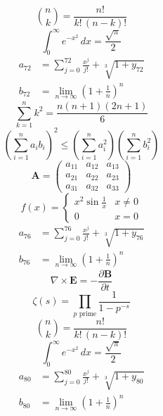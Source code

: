 \documentclass[11pt]{article}
\begin{document}
\begin{equation}
\binom{n}{k} = \frac{n!}{k!\,(n-k)!}
\end{equation}
\begin{equation}
\int_0^\infty e^{-x^2}\,dx = \frac{\sqrt{\pi}}{2}
\end{equation}
\begin{align}
  a_{72} &= \sum_{j=0}^{72} \frac{x^j}{j!} + \sqrt[3]{1+y_{72}} \\
  b_{72} &= \lim_{n\to\infty} \left(1+\frac{1}{n}\right)^{n}
\end{align}
\begin{equation}
\sum_{k=1}^{n} k^2 = \frac{n(n+1)(2n+1)}{6}
\end{equation}
\begin{equation}
\left( \sum_{i=1}^n a_i b_i \right)^2 \le \left(\sum_{i=1}^n a_i^2\right)\left(\sum_{i=1}^n b_i^2\right)
\end{equation}
\begin{equation}
\mathbf{A} = \begin{pmatrix} a_{11} & a_{12} & a_{13} \\ a_{21} & a_{22} & a_{23} \\ a_{31} & a_{32} & a_{33} \end{pmatrix}
\end{equation}
\begin{equation}
f(x) = \begin{cases} x^2 \sin\frac{1}{x} & x \ne 0 \\ 0 & x = 0 \end{cases}
\end{equation}
\begin{align}
  a_{76} &= \sum_{j=0}^{76} \frac{x^j}{j!} + \sqrt[3]{1+y_{76}} \\
  b_{76} &= \lim_{n\to\infty} \left(1+\frac{1}{n}\right)^{n}
\end{align}
\begin{equation}
\nabla \times \mathbf{E} = -\frac{\partial \mathbf{B}}{\partial t}
\end{equation}
\begin{equation}
\zeta(s) = \prod_{p \text{ prime}} \frac{1}{1 - p^{-s}}
\end{equation}
\begin{equation}
\binom{n}{k} = \frac{n!}{k!\,(n-k)!}
\end{equation}
\begin{equation}
\int_0^\infty e^{-x^2}\,dx = \frac{\sqrt{\pi}}{2}
\end{equation}
\begin{align}
  a_{80} &= \sum_{j=0}^{80} \frac{x^j}{j!} + \sqrt[3]{1+y_{80}} \\
  b_{80} &= \lim_{n\to\infty} \left(1+\frac{1}{n}\right)^{n}
\end{align}
\end{document}
